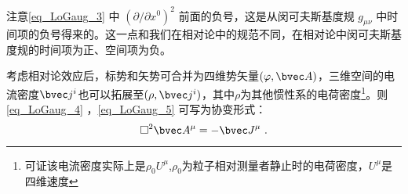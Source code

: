 注意\autoref{eq_LoGaug_3} 中 $(\partial/\partial x^0)^2$ 前面的负号，这是从闵可夫斯基度规 $g_{\mu\nu}$ 中时间项的负号得来的。这一点和我们在相对论中的规范不同，在相对论中闵可夫斯基度规的时间项为正、空间项为负。

考虑相对论效应后，标势和矢势可合并为四维势矢量$(\varphi,\bvec A)$，三维空间的电流密度$\bvec j^i$也可以拓展至$(\rho, \bvec j^i)$，其中$\rho$为其他惯性系的电荷密度\footnote{可证该电流密度实际上是$\rho_0U^{\mu}$,$\rho_0$为粒子相对测量者静止时的电荷密度，$U^{\mu}$是四维速度}。则\autoref{eq_LoGaug_4} ，\autoref{eq_LoGaug_5} 可写为协变形式：
\begin{equation}
\square^2 \bvec A^{\mu}=-\bvec J^{\mu}~.
\end{equation}





